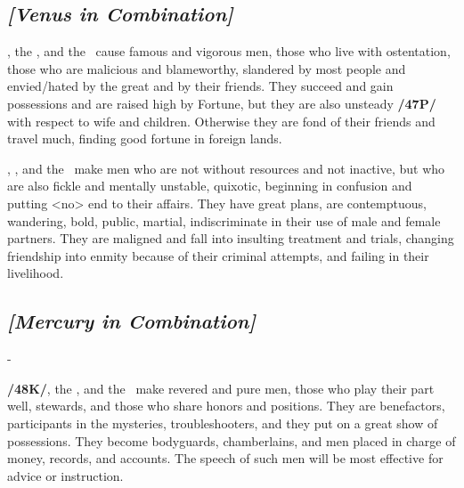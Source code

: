 \subsection{\textit{[Venus in Combination]}}
\Venus, the \Sun, and the \Moon\, cause famous and vigorous men, those who live with ostentation, those who are malicious and blameworthy, slandered by most people and envied/hated by the great and by their friends. They succeed and gain possessions and are raised high by Fortune, but they are also unsteady \textbf{/47P/} with respect to wife and children. Otherwise they are fond of their friends and travel much, finding good fortune in foreign lands.

\Venus, \Mars, and the \Moon\, make men who are not without resources and not inactive, but who are also fickle and mentally unstable, quixotic, beginning in confusion and putting <no> end to their affairs. They have great plans, are contemptuous, wandering, bold, public, martial, indiscriminate in their use of male and female partners. They are maligned and fall into insulting treatment and trials, changing friendship into enmity because of their criminal attempts, and failing in their livelihood.

\secbr
\subsection{\textit{[Mercury in Combination]}}-

\textbf{/48K/}\Mercury, the \Sun, and the \Moon\, make revered and pure men, those who play their part well, stewards, and those who share honors and positions. They are benefactors, participants in the mysteries, troubleshooters, and they put on a great show of possessions. They become bodyguards, chamberlains, and men placed in charge of money, records, and accounts. The speech of such men will be most effective for advice or instruction.

